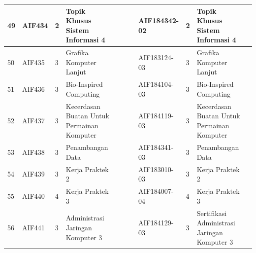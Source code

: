 \begin{landscape}
\begin{table}[H]
\begin{tabular}{|p{0.35cm}|p{1.75cm}|p{0.65cm}|p{3.55cm}|p{2.1cm}|p{0.65cm}|p{3.55cm}|p{2.1cm}|p{0.65cm}|p{3.55cm}|p{1.75cm}|}
49 & AIF434 & 2 & Topik Khusus Sistem Informasi 4 &  &  &  & AIF184342-02 & 2 & Topik Khusus Sistem Informasi 4 &  \\ \hline
50 & AIF435 & 3 & Grafika Komputer Lanjut &  &  &  & AIF183124-03 & 3 & Grafika Komputer Lanjut &  \\ \hline
51 & AIF436 & 3 & Bio-Inspired Computing &  &  &  & AIF184104-03 & 3 & Bio-Inspired Computing &  \\ \hline
52 & AIF437 & 3 & Kecerdasan Buatan Untuk Permainan Komputer &  &  &  & AIF184119-03 & 3 & Kecerdasan Buatan Untuk Permainan Komputer &  \\ \hline
53 & AIF438 & 3 & Penambangan Data &  &  &  & AIF184341-03 & 3 & Penambangan Data &  \\ \hline
54 & AIF439 & 3 & Kerja Praktek 2 &  &  &  & AIF183010-03 & 3 & Kerja Praktek 2 &  \\ \hline
55 & AIF440 & 4 & Kerja Praktek 3 &  &  &  & AIF184007-04 & 4 & Kerja Praktek 3 &  \\ \hline
56 & AIF441 & 3 & Administrasi Jaringan Komputer 3 &  &  &  & AIF184129-03 & 3 & Sertifikasi Administrasi Jaringan Komputer 3 &  \\ \hline
\end{tabular}
\end{table}


\end{landscape}

